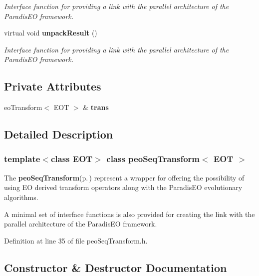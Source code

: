 \begin{CompactItemize}
\begin{CompactList}\small\item\em Interface function for providing a link with the parallel architecture of the Paradis\-EO framework. \item\end{CompactList}\item 
virtual void {\bf unpack\-Result} ()\label{classpeo_seq_transform_5dd029fc011eb2a810ca1140025129b1}

\begin{CompactList}\small\item\em Interface function for providing a link with the parallel architecture of the Paradis\-EO framework. \item\end{CompactList}\end{CompactItemize}
\subsection*{Private Attributes}
\begin{CompactItemize}
\item 
eo\-Transform$<$ EOT $>$ \& {\bf trans}\label{classpeo_seq_transform_ad3e16c59dd6c46dfc1baf7b88af30cf}

\end{CompactItemize}


\subsection{Detailed Description}
\subsubsection*{template$<$class EOT$>$ class peo\-Seq\-Transform$<$ EOT $>$}

The {\bf peo\-Seq\-Transform}{\rm (p.\,\pageref{classpeo_seq_transform})} represent a wrapper for offering the possibility of using EO derived transform operators along with the Paradis\-EO evolutionary algorithms. 

A minimal set of interface functions is also provided for creating the link with the parallel architecture of the Paradis\-EO framework. 



Definition at line 35 of file peo\-Seq\-Transform.h.

\subsection{Constructor \& Destructor Documentation}
